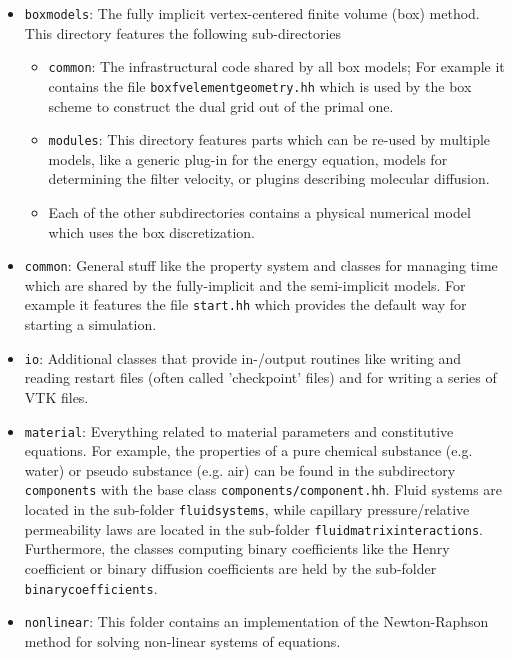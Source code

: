 \begin{itemize} 

\item \texttt{boxmodels}: The fully implicit vertex-centered finite
  volume (box) method. This directory features the following
  sub-directories
  \begin{itemize} 
  \item \texttt{common}: The infrastructural code shared by all box
    models; For example it contains the file
    \texttt{boxfvelementgeometry.hh} which is used by the box scheme to
    construct the dual grid out of the primal one.
  \item \texttt{modules}: This directory features parts which can be
    re-used by multiple models, like a generic plug-in for the energy
    equation, models for determining the filter velocity, or plugins
    describing molecular diffusion.
  \item Each of the other subdirectories contains 
    a physical numerical model which uses the box discretization.
  \end{itemize}

\item \texttt{common}: General stuff like the \eWoms property system
  and classes for managing time which are shared by the fully-implicit
  and the semi-implicit models.  For example it features the file
  \texttt{start.hh} which provides the default way for starting a
  simulation.

\item \texttt{io}: Additional classes that provide in-/output routines
  like writing and reading restart files (often called 'checkpoint'
  files) and for writing a series of VTK files.

\item \texttt{material}: Everything related to material parameters and
  constitutive equations. For example, the properties of a pure
  chemical substance (e.g. water) or pseudo substance (e.g. air) can
  be found in the subdirectory \texttt{components} with the base class
  \texttt{components/component.hh}. Fluid systems are located in the
  sub-folder \texttt{fluidsystems}, while capillary pressure/relative
  permeability laws are located in the sub-folder
  \texttt{fluidmatrixinteractions}. Furthermore, the classes computing
  binary coefficients like the Henry coefficient or binary diffusion
  coefficients are held by the sub-folder \texttt{binarycoefficients}.

\item \texttt{nonlinear}: This folder contains an implementation of
  the Newton-Raphson method for solving non-linear systems of
  equations.


\end{itemize}
